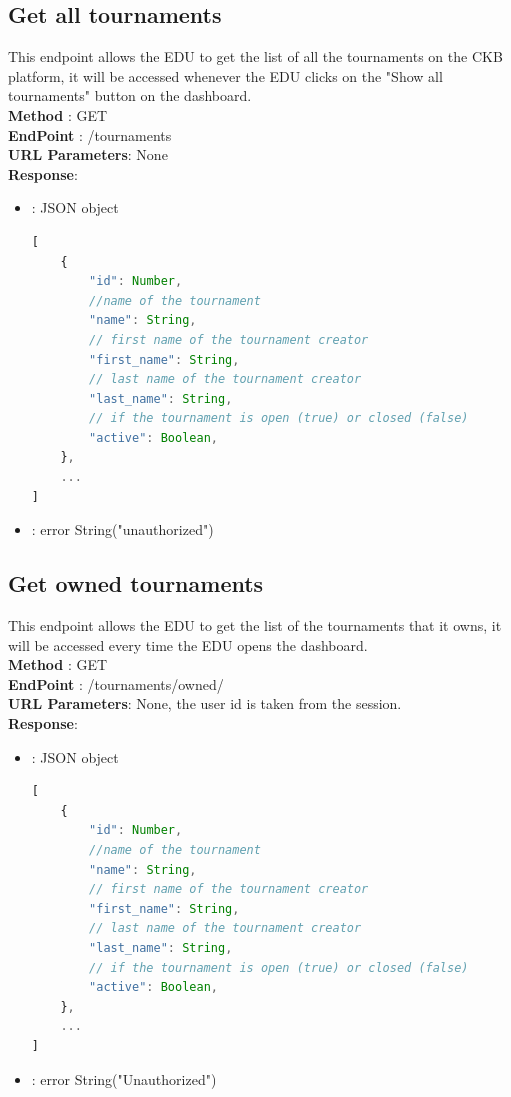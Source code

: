 \subsection*{Get all tournaments}
This endpoint allows the EDU to get the list of all the tournaments on the CKB platform, it will be accessed whenever the EDU clicks on the "Show all tournaments" button on the dashboard.\\
\textbf{Method} : GET \\
\textbf{EndPoint} : /tournaments \\
\textbf{URL Parameters}: None \\
\textbf{Response}:
\begin{itemize}
    \item {} : JSON object
          \begin{lstlisting}[language=JavaScript, label={lst:jscode}, basicstyle=\ttfamily]
[
    {
        "id": Number,
        //name of the tournament
        "name": String,
        // first name of the tournament creator
        "first_name": String, 
        // last name of the tournament creator
        "last_name": String,
        // if the tournament is open (true) or closed (false)
        "active": Boolean,
    },
    ...
]
        \end{lstlisting}
    \item {}: error String("unauthorized")
\end{itemize}

\subsection*{Get owned tournaments}
This endpoint allows the EDU to get the list of the tournaments that it owns, it will be accessed every time the EDU opens the dashboard.\\
\textbf{Method} : GET \\
\textbf{EndPoint} : /tournaments/owned/\\
\textbf{URL Parameters}:
None, the user id is taken from the session.\\
\textbf{Response}:
\begin{itemize}
    \item {} : JSON object
          \begin{lstlisting}[language=JavaScript, label={lst:jscode}, basicstyle=\ttfamily]
[
    {
        "id": Number,
        //name of the tournament
        "name": String,
        // first name of the tournament creator
        "first_name": String, 
        // last name of the tournament creator
        "last_name": String,
        // if the tournament is open (true) or closed (false)
        "active": Boolean,
    },
    ...
]
            \end{lstlisting}
    \item {} : error String("Unauthorized")
\end{itemize}

